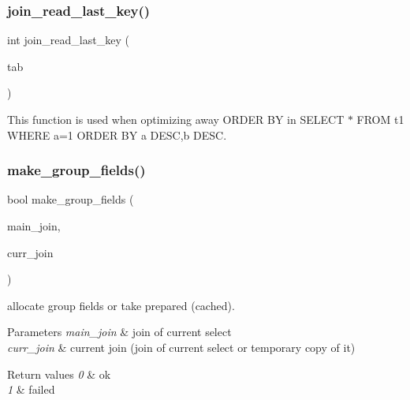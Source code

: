 \subsubsection{\texorpdfstring{join\+\_\+read\+\_\+last\+\_\+key()}{join\_read\_last\_key()}}
{\footnotesize\ttfamily int join\+\_\+read\+\_\+last\+\_\+key (\begin{DoxyParamCaption}\item[{\mbox{\hyperlink{classQEP__TAB}{Q\+E\+P\+\_\+\+T\+AB}} $\ast$}]{tab }\end{DoxyParamCaption})}

This function is used when optimizing away O\+R\+D\+ER BY in S\+E\+L\+E\+CT $\ast$ F\+R\+OM t1 W\+H\+E\+RE a=1 O\+R\+D\+ER BY a D\+E\+SC,b D\+E\+SC. \mbox{\label{group__Query__Executor_gaa0bd2dbcf106da50227e2eb4932b588d}} 
\subsubsection{\texorpdfstring{make\+\_\+group\+\_\+fields()}{make\_group\_fields()}}
{\footnotesize\ttfamily bool make\+\_\+group\+\_\+fields (\begin{DoxyParamCaption}\item[{\mbox{\hyperlink{classJOIN}{J\+O\+IN}} $\ast$}]{main\+\_\+join,  }\item[{\mbox{\hyperlink{classJOIN}{J\+O\+IN}} $\ast$}]{curr\+\_\+join }\end{DoxyParamCaption})}

allocate group fields or take prepared (cached).


\begin{DoxyParams}{Parameters}
{\em main\+\_\+join} & join of current select \\
\hline
{\em curr\+\_\+join} & current join (join of current select or temporary copy of it)\\
\hline
\end{DoxyParams}

\begin{DoxyRetVals}{Return values}
{\em 0} & ok \\
\hline
{\em 1} & failed \\
\hline
\end{DoxyRetVals}
\mbox{\label{group__Query__Executor_gaf6ecbbe7a1950c60e06170bce55ff70e}} 
